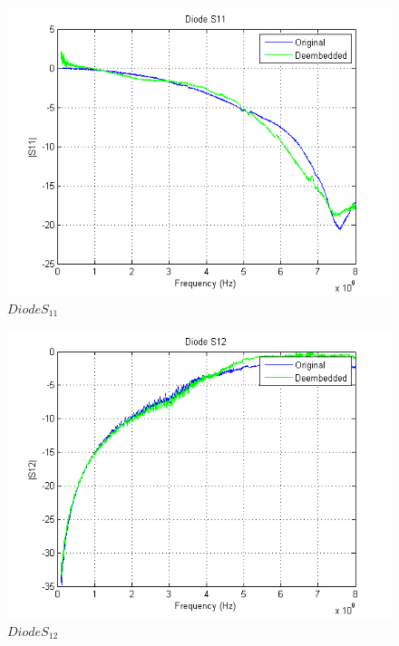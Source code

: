 \documentclass{article} %
\begin{document}
	\begin{figure}[!h]
		\centering
		\label{fig:DS11}
		\caption{$Diode S_{11}$}
		\includegraphics{DiodeS11}
	\end{figure}
	
	\begin{figure}[!H]
		\centering
		\label{fig:DS12}
		\caption{$Diode S_{12}$}
		\includegraphics{DiodeS12}
	\end{figure}
	
\end{document}
